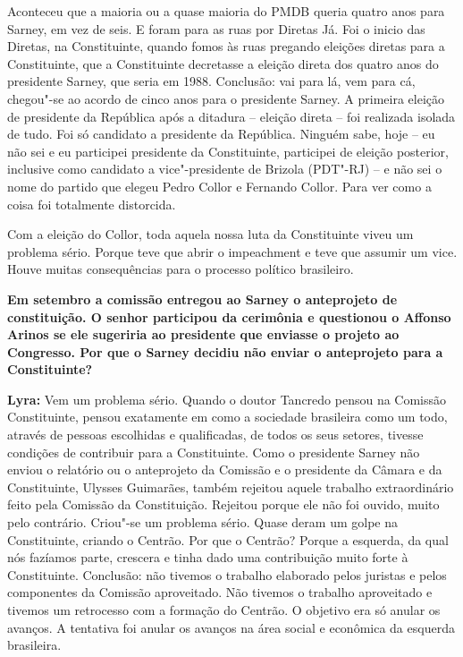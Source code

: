 Aconteceu que a maioria ou a quase maioria do PMDB queria quatro anos
para Sarney, em vez de seis. E foram para as ruas por Diretas Já. Foi o
inicio das Diretas, na Constituinte, quando fomos às ruas pregando
eleições diretas para a Constituinte, que a Constituinte decretasse a
eleição direta dos quatro anos do presidente Sarney, que seria em 1988.
Conclusão: vai para lá, vem para cá, chegou"-se ao acordo de cinco anos
para o presidente Sarney. A primeira eleição de presidente da República
após a ditadura -- eleição direta -- foi realizada isolada de tudo. Foi
só candidato a presidente da República. Ninguém sabe, hoje -- eu não sei
e eu participei presidente da Constituinte, participei de eleição
posterior, inclusive como candidato a vice"-presidente de Brizola
(PDT"-RJ) -- e não sei o nome do partido que elegeu Pedro Collor e
Fernando Collor. Para ver como a coisa foi totalmente distorcida.

Com a eleição do Collor, toda aquela nossa luta da Constituinte viveu um
problema sério. Porque teve que abrir o impeachment e teve que assumir
um vice. Houve muitas consequências para o processo político brasileiro.

\textbf{Em setembro a comissão entregou ao Sarney o anteprojeto de
constituição. O senhor participou da cerimônia e questionou o Affonso
Arinos se ele sugeriria ao presidente que enviasse o projeto ao
Congresso. Por que o Sarney decidiu não enviar o anteprojeto para a
Constituinte?}

\textbf{Lyra:} Vem um problema sério. Quando o doutor Tancredo pensou na
Comissão Constituinte, pensou exatamente em como a sociedade brasileira
como um todo, através de pessoas escolhidas e qualificadas, de todos os
seus setores, tivesse condições de contribuir para a Constituinte. Como
o presidente Sarney não enviou o relatório ou o anteprojeto da Comissão
e o presidente da Câmara e da Constituinte, Ulysses Guimarães, também
rejeitou aquele trabalho extraordinário feito pela Comissão da
Constituição. Rejeitou porque ele não foi ouvido, muito pelo contrário.
Criou"-se um problema sério. Quase deram um golpe na Constituinte,
criando o Centrão. Por que o Centrão? Porque a esquerda, da qual nós
fazíamos parte, crescera e tinha dado uma contribuição muito forte à
Constituinte. Conclusão: não tivemos o trabalho elaborado pelos juristas
e pelos componentes da Comissão aproveitado. Não tivemos o trabalho
aproveitado e tivemos um retrocesso com a formação do Centrão. O
objetivo era só anular os avanços. A tentativa foi anular os avanços na
área social e econômica da esquerda brasileira.

